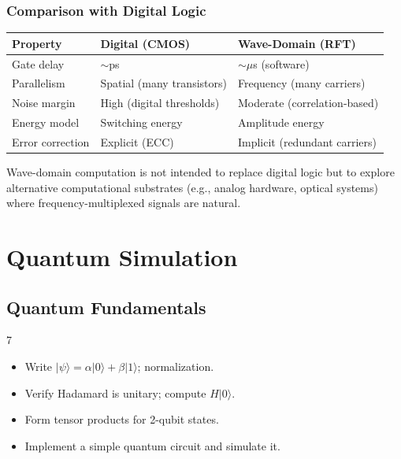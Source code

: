 \documentclass[11pt, a4paper, openany]{book}
\theoremstyle{definition}
\begin{document}
\section{Comparison with Digital Logic}
\begin{table}[h]
\centering
\begin{tabular}{@{}lll@{}}\toprule
Property & Digital (CMOS) & Wave-Domain (RFT) \\ \midrule
Gate delay & $\sim$ps & $\sim\mu$s (software) \\
Parallelism & Spatial (many transistors) & Frequency (many carriers) \\
Noise margin & High (digital thresholds) & Moderate (correlation-based) \\
Energy model & Switching energy & Amplitude energy \\
Error correction & Explicit (ECC) & Implicit (redundant carriers) \\ \bottomrule
\end{tabular}
\end{table}

Wave-domain computation is not intended to replace digital logic but to explore alternative computational substrates (e.g., analog hardware, optical systems) where frequency-multiplexed signals are natural.

\part{Quantum Simulation}

\chapter{Quantum Fundamentals}

\begin{todobox}{7}
\begin{itemize}
    \item[$\square$] Write $|\psi\rangle = \alpha|0\rangle+\beta|1\rangle$; normalization.
    \item[$\square$] Verify Hadamard is unitary; compute $H|0\rangle$.
    \item[$\square$] Form tensor products for 2-qubit states.
    \item[$\square$] Implement a simple quantum circuit and simulate it.
\end{itemize}
\end{todobox}
\end{document}
